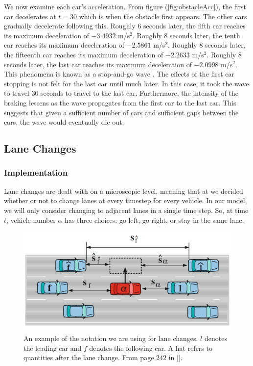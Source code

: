 \documentclass[12pt]{article}
\begin{document}
    We now examine each car's acceleration. From figure (\ref{fig:obstacleAcc}), the first car decelerates at $t=30$ which is when the obstacle first appears. The other cars gradually decelerate following this. Roughly $6$ seconds later, the fifth car reaches its maximum deceleration of $-3.4932$ m/s$^2$. Roughly $8$ seconds later, the tenth car reaches its maximum deceleration of $-2.5861$ m/s$^2$. Roughly $8$ seconds later, the fifteenth car reaches its maximum deceleration of $-2.2633$ m/s$^2$. Roughly $8$ seconds later, the last car reaches its maximum deceleration of $-2.0998$ m/s$^2$. This phenomena is known as a stop-and-go wave \cite{traffic}. The effects of the first car stopping is not felt for the last car until much later. In this case, it took the wave to travel $30$ seconds to travel to the last car. Furthermore, the intensity of the braking lessens as the wave propagates from the first car to the last car. This suggests that given a sufficient number of cars and sufficient gaps between the cars, the wave would eventually die out. 
    \subsection{Lane Changes}
    \subsubsection{Implementation}\label{sec:laneChangeImplementation}

   Lane changes are dealt with on a microscopic level, meaning that at we decided whether or not to change lanes at every timestep for every vehicle.  In our model, we will only consider changing to adjacent lanes in a single time step. So, at time $t$, vehicle number $\alpha$ has three choices: go left, go right, or stay in the same lane.

      \begin{figure}[H]
        \begin{center}
          \includegraphics{lane_change_diagram.PNG}
        \end{center}
        \caption{An example of the notation we are using for lane changes. $l$ denotes the leading car and $f$ denotes the following car. A hat refers to quantities after the lane change. From page $242$ in [\cite{traffic}].}
      \end{figure}
\end{document}
